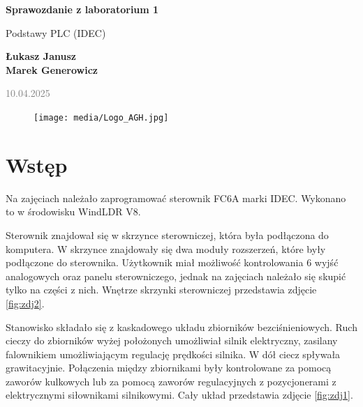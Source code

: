 \documentclass{article}
\begin{document}
\begin{titlepage}
    \begin{center}
        \vspace*{1cm}
            
        \Huge
        \textbf{Sprawozdanie z laboratorium 1}
            
        \vspace{0.5cm}
        \LARGE
        Podstawy PLC (IDEC)
            
        \vspace{1.5cm}
            
        \textbf{Łukasz Janusz\\Marek Generowicz}

        \normalsize      
        \textcolor{gray}{10.04.2025}
        \vfill
        \begin{figure}[hb]
            \centering
            \texttt{[image: media/Logo\_AGH.jpg]}
        \end{figure}   
    \end{center}
\end{titlepage}

\newpage
\section{Wstęp}
Na zajęciach należało zaprogramować sterownik FC6A marki IDEC. Wykonano to w środowisku WindLDR V8.

Sterownik znajdował się w skrzynce sterowniczej, która była podłączona do komputera. W skrzynce znajdowały się dwa moduły rozszerzeń, które były podłączone do sterownika. Użytkownik miał możliwość kontrolowania 6 wyjść analogowych oraz panelu sterowniczego, jednak na zajęciach należało się skupić tylko na części z nich. Wnętrze skrzynki sterowniczej przedstawia zdjęcie \ref{fig:zdj2}.

Stanowisko składało się z kaskadowego układu zbiorników bezciśnieniowych. Ruch cieczy do zbiorników wyżej położonych umożliwiał silnik elektryczny, zasilany falownikiem umożliwiającym regulację prędkości silnika. W dół ciecz spływała grawitacyjnie. Połączenia między zbiornikami były kontrolowane za pomocą zaworów kulkowych lub za pomocą zaworów regulacyjnych z pozycjonerami z elektrycznymi siłownikami silnikowymi. Cały układ przedstawia zdjęcie \ref{fig:zdj1}. 
\end{document}
